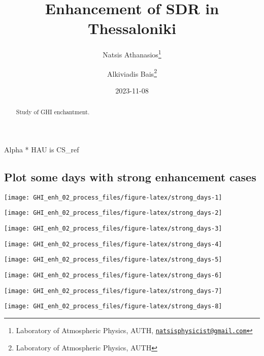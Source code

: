 \documentclass[
  10pt,
  a4paper,oneside]{article}
\title{Enhancement of SDR in Thessaloniki}
\author{Natsis Athanasios\footnote{Laboratory of Atmospheric Physics, AUTH, \href{mailto:natsisphysicist@gmail.com}{\nolinkurl{natsisphysicist@gmail.com}}} \and Alkiviadis Bais\footnote{Laboratory of Atmospheric Physics, AUTH}}
\date{2023-11-08}
\begin{document}
\maketitle
\begin{abstract}
Study of GHI enchantment.
\end{abstract}

{
\hypersetup{linkcolor=}
\setcounter{tocdepth}{4}
\tableofcontents
}
Alpha * HAU is CS\_ref

\hypertarget{plot-some-days-with-strong-enhancement-cases}{%
\subsection{Plot some days with strong enhancement cases}\label{plot-some-days-with-strong-enhancement-cases}}

\begin{center}\texttt{[image: GHI\_enh\_02\_process\_files/figure-latex/strong\_days-1]} \end{center}

\begin{center}\texttt{[image: GHI\_enh\_02\_process\_files/figure-latex/strong\_days-2]} \end{center}

\begin{center}\texttt{[image: GHI\_enh\_02\_process\_files/figure-latex/strong\_days-3]} \end{center}

\begin{center}\texttt{[image: GHI\_enh\_02\_process\_files/figure-latex/strong\_days-4]} \end{center}

\begin{center}\texttt{[image: GHI\_enh\_02\_process\_files/figure-latex/strong\_days-5]} \end{center}

\begin{center}\texttt{[image: GHI\_enh\_02\_process\_files/figure-latex/strong\_days-6]} \end{center}

\begin{center}\texttt{[image: GHI\_enh\_02\_process\_files/figure-latex/strong\_days-7]} \end{center}

\begin{center}\texttt{[image: GHI\_enh\_02\_process\_files/figure-latex/strong\_days-8]} \end{center}
\end{document}

